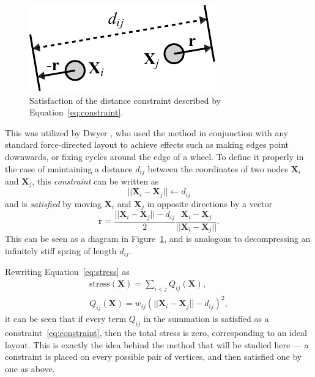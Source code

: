 \begin{figure}
  \centering
  \includegraphics[width=.5\textwidth]{stress/satisfaction.pdf}
  \caption[Illustration of the distance constraint in Equation~\ref{eq:constraint}]{Satisfaction of the distance constraint described by Equation~\eqref{eq:constraint}.}
  \label{fig:satisfaction}
\end{figure}

This was utilized by Dwyer \cite{Dwyer2009}, who used the method in conjunction with any standard force-directed layout to achieve effects such as making edges point downwards, or fixing cycles around the edge of a wheel. To define it properly in the case of maintaining a distance $d_{ij}$ between the coordinates of two nodes $\mathbf{X}_i$ and $\mathbf{X}_j$, this \emph{constraint} can be written as
\begin{equation}
  ||\mathbf{X}_i - \mathbf{X}_j|| \leftarrow d_{ij}
  \label{eq:constraint}
\end{equation}
and is \emph{satisfied} by moving $\mathbf{X}_i$ and $\mathbf{X}_j$ in opposite directions by a vector
\begin{equation}
  \mathbf{r} = \frac{||\mathbf{X}_i - \mathbf{X}_j||-d_{ij}}{2}\frac{\mathbf{X}_i - \mathbf{X}_j}{||\mathbf{X}_i - \mathbf{X}_j||}.
  \label{eq:satisfaction}
\end{equation}
This can be seen as a diagram in Figure~\ref{fig:satisfaction}, and is analogous to decompressing an infinitely stiff spring of length $d_{ij}$.

Rewriting Equation~\eqref{eq:stress} as
\begin{gather}
\label{stress-terms}
\mathrm{stress}(\mathbf{X}) = \sum_{i<j} Q_{ij}(\mathbf{X}),\\
\label{qij}
Q_{ij}(\mathbf{X}) = w_{ij}(||\mathbf{X}_i - \mathbf{X}_j|| - d_{ij})^2,
\end{gather}
it can be seen that if every term $Q_{ij}$ in the summation is satisfied as a constraint~\eqref{eq:constraint}, then the total stress is zero, corresponding to an ideal layout. 
This is exactly the idea behind the method that will be studied here --- a constraint is placed on every possible pair of vertices, and then satisfied one by one as above.

